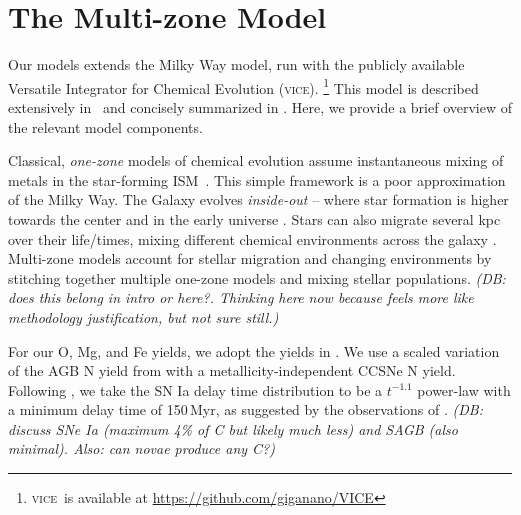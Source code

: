 \documentclass[fleqn,
usenatbib]{mnras}
\newcommand{\JJ}{\citetalias{james+21}}
\newcommand{\VICE}{\textsc{vice}}
\newcommand{\ia}{SN Ia}
\newcommand{\dbnote}[1]{ {\color{Thistle} \textit{\small (DB: #1)}} }
\begin{document}
\section{The Multi-zone Model}\label{sec:vice}

Our models extends the \citet[hereafter \JJ]{james+21} Milky Way model, run with the publicly available Versatile Integrator for Chemical Evolution (\VICE).%
    \footnote{\VICE~is available at \url{https://github.com/giganano/VICE}}
This model is described extensively in \JJ~and concisely summarized  in \citet{james+23}. Here, we provide a brief overview of the relevant model components.

Classical, \textit{one-zone} models of chemical evolution assume instantaneous mixing of metals in the star-forming ISM\ \citep[e.g.][]{matteucci21}. This simple framework is a poor approximation of the Milky Way.  The Galaxy evolves \textit{inside-out} -- where star formation is higher towards the center and in the early universe \citep{WF91, kauffmann96, bird+13}. Stars can also migrate several kpc over their life/times, mixing different chemical environments across the galaxy \citep{bird+12,sellwood+binney02}. Multi-zone models account for stellar migration and changing environments by stitching together multiple one-zone models and mixing stellar populations. \dbnote{does this belong in intro or here?. Thinking here now because feels more like methodology justification, but not sure still.}

For our O, Mg, and Fe yields, we adopt the yields in \citet{david_fe}. We use a scaled variation of the AGB N yield from \citet{james+23} with a metallicity-independent CCSNe N yield. 
Following \citet{james+21, james+23}, we take the \ia{} delay time distribution to be a $t^{-1.1}$ power-law with a minimum delay time of 150\,Myr, as suggested by the observations of \citet{maoz+12}. 
\dbnote{discuss SNe Ia (maximum 4\% of C but likely much less) and SAGB (also minimal). Also: can novae produce any C?}
\end{document}
